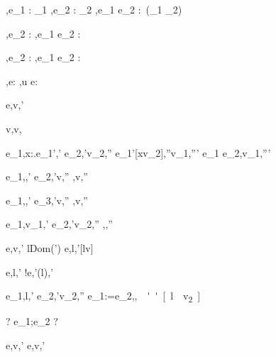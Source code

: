   {\Gamma,\Sigma \infers e_1 : \Task \tau_1 \Quad
   \Gamma,\Sigma \infers e_2 : \Task \tau_2}
  {\Gamma,\Sigma \infers e_1 \And e_2 : \Task\,(\tau_1 \times \tau_2)}


  {
   {\Gamma,\Sigma \infers e_2 : \Task \tau}}
  {\Gamma,\Sigma \infers e_1 \Or e_2 : \Task \tau}


  {
   {\Gamma,\Sigma \infers e_2 : \Task \tau}}
  {\Gamma,\Sigma \infers e_1 \Xor e_2 : \Task \tau}


  {\Gamma,\Sigma\infers e:\Task\tau}
  {\Gamma,\Sigma\infers u \At e:\Task\tau}





  {e,\sigma \evaluate v,\sigma'}


  {}
  {v,\sigma \evaluate v,\sigma}


  {e_1,\sigma \evaluate \lambda x:\tau.e_1',\sigma' \Quad
   e_2,\sigma'\evaluate v_2,\sigma'' \Quad
   e_1'[x\mapsto v_2],\sigma''\evaluate v_1,\sigma'''}
  {e_1 e_2,\sigma \evaluate v_1,\sigma'''}


  {e_1,\sigma \evaluate \True,\sigma' \Quad
   e_2,\sigma'\evaluate v,\sigma''}
  {,\sigma \evaluate v,\sigma''}

  {e_1,\sigma \evaluate \False,\sigma' \Quad
   e_3,\sigma'\evaluate v,\sigma''}
  {,\sigma \evaluate v,\sigma''}


  {e_1,\sigma \evaluate v_1,\sigma' \Quad
   e_2,\sigma'\evaluate v_2,\sigma''}
  {,\sigma \evaluate{},\sigma''}


  {e,\sigma \evaluate v,\sigma' \Quad
   l\not\in Dom(\sigma')}
  {\Ref e,\sigma \evaluate l,\sigma'[l\mapsto v]}

  {e,\sigma \evaluate l,\sigma'}
  {!e,\sigma \evaluate \sigma'(l),\sigma'}

  {e_1,\sigma \evaluate l,\sigma' \Quad
   e_2,\sigma'\evaluate v_2,\sigma''}
  {e_1:=e_2,\sigma \evaluate \unit,\sigma''[l\mapsto v_2]}


  {?}
  {e_1;e_2 \evaluate ?}

  {e,\sigma \evaluate v,\sigma'}
  {\Edit e,\sigma \evaluate \Edit v,\sigma'}

